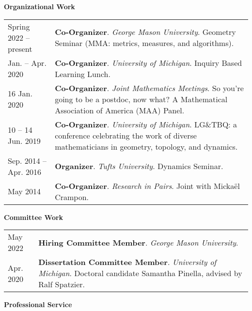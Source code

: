     \vspace{-1em}
    

    \textbf{\large Organizational Work}
    
    \begin{center}
    {
    \renewcommand{\arraystretch}{1.2}
    \begin{longtable}{p{}  p{}}
      Spring 2022 --    present & \textbf{Co-Organizer}. \textit{George Mason University}.  Geometry Seminar (MMA: metrics, measures, and algorithms).  \\ 
 Jan.  --  Apr.  2020 & \textbf{Co-Organizer}. \textit{University of Michigan}.  Inquiry Based Learning Lunch.  \\ 
16 Jan.  2020 & \textbf{Co-Organizer}. \textit{Joint Mathematics Meetings}.  So you're going to be a postdoc, now what? A Mathematical Association of America (MAA) Panel.  \\ 
10  -- 14 Jun.  2019 & \textbf{Co-Organizer}. \textit{University of Michigan}.  LG\&TBQ: a conference celebrating the work of diverse mathematicians
in geometry, topology, and dynamics.  \\ 
 Sep.  2014 --  Apr.  2016 & \textbf{Organizer}. \textit{Tufts University}.  Dynamics Seminar.  \\ 
 May  2014 & \textbf{Co-Organizer}. \textit{Research in Pairs}.  Joint with Micka\"el Crampon.  
    \end{longtable}
    } 
    \end{center}

    \vspace{-1em}
    

    \textbf{\large Committee Work}
    
    \begin{center}
    {
    \renewcommand{\arraystretch}{1.2}
    \begin{longtable}{p{}  p{}}
     May  2022 & \textbf{Hiring Committee Member}. \textit{George Mason University}.  \\ 
 Apr.  2020 & \textbf{Dissertation Committee Member}. \textit{University of Michigan}.  Doctoral candidate Samantha Pinella, advised by Ralf Spatzier.  
    \end{longtable}
    } 
    \end{center}

    \vspace{-1em}
    

    \textbf{\large Professional Service}
    
